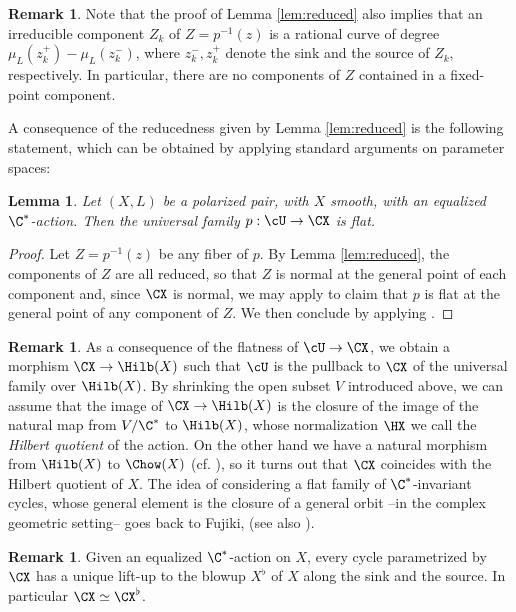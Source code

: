 \documentclass[reqno]{amsproc}
\newtheorem{lemma}[theorem]{Lemma}
\theoremstyle{definition}
\newtheorem{remark}[theorem]{Remark}
\begin{document}
\begin{remark}\label{rem:ratcomp}
Note that the proof of Lemma \ref{lem:reduced} also implies that an irreducible component $Z_k$ of $Z=p^{-1}(z)$  is a rational curve of degree $\mu_L(z_k^+)-\mu_L(z_k^-)$, where $z_k^-,z_k^+$ denote the sink and the source of $Z_k$, respectively.  In particular, there are no components of $Z$ contained in a fixed-point component.
\end{remark}

A consequence of the reducedness given by Lemma \ref{lem:reduced} is the following statement, which can be obtained by applying standard arguments on parameter spaces:

\begin{lemma}\label{lem:flat}
Let $(X,L)$ be a polarized pair, with $X$ smooth,  with an equalized $\C^*$-action.   
Then the universal family $p:\cU\to \CX$  is flat.
\end{lemma}

\begin{proof}
Let $Z=p^{-1}(z)$ be any fiber of $p$. By Lemma \ref{lem:reduced}, the components of $Z$ are all reduced, so that $Z$ is normal at the general point of each component and, since $\CX$ is normal, we may apply \cite[Theorem~I.6.6]{kollar} to claim that $p$ is flat at the general point of any component of $Z$. We then conclude by applying \cite[Theorem~I.7.3.1]{kollar}. 
\end{proof}

\begin{remark}\label{rem:Hilb}
As a consequence of the flatness of $\cU\to \CX$, we obtain a morphism $\CX\to \Hilb(X)$ such that $\cU$ is the pullback to $\CX$ of the universal family over $\Hilb(X)$. By shrinking the open subset $V$ introduced above, we can assume that the image of $\CX\to \Hilb(X)$ is the closure of the image of the natural map from $V/\C^*$ to $\Hilb(X)$, whose normalization $\HX$ we call the {\em Hilbert quotient} of the action. On the other hand we have a natural morphism from $\Hilb(X)$ to $\Chow(X)$ (cf. \cite[Theorem I.6.3]{kollar}), so it turns out that $\CX$ coincides with the Hilbert quotient of $X$. The idea of considering a flat family of $\C^*$-invariant cycles, whose general element is the closure of a general orbit --in the complex geometric setting-- goes back to Fujiki, \cite{Fj} (see also \cite[Theorem~0.1.2]{BBSo}).
\end{remark}

\begin{remark}\label{rem:chblow}
Given an equalized $\C^*$-action on $X$, every cycle parametrized by $\CX$ has a unique lift-up to the blowup $X^\flat$  of $X$ along the sink and the source. In particular  $\CX \simeq \CX^\flat$.
\end{remark}
\end{document}
